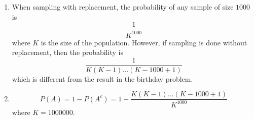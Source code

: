 \begin{enumerate}[label=(\alph*)]
\item  When sampling with replacement, the probability of any sample of size $1000$ is $$\frac{1}{K^{1000}}$$ where $K$ is the size of the population. However, if sampling is done without replacement, then the probability is $$\frac{1}{K(K-1) \dots (K-1000+1)}$$ which is different from the result in the birthday problem.

\item $$P(A) = 1 - P(A^{c}) = 1 - \frac{K(K-1) \dots (K-1000+1)}{K^{1000}}$$ where $K = 1000000$.
\end{enumerate}
